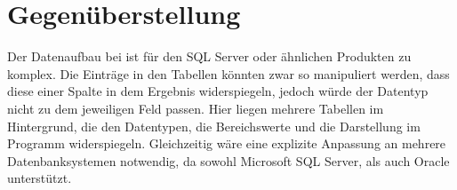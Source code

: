 \section{Gegenüberstellung}
Der Datenaufbau bei \BMD ist für den SQL Server oder ähnlichen Produkten zu komplex.
Die Einträge in den Tabellen könnten zwar so manipuliert werden, dass diese einer Spalte in dem Ergebnis widerspiegeln, jedoch würde der Datentyp nicht zu dem jeweiligen Feld passen. Hier liegen mehrere Tabellen im Hintergrund, die den Datentypen, die Bereichswerte und die Darstellung im Programm widerspiegeln. 
Gleichzeitig wäre eine explizite Anpassung an mehrere Datenbanksystemen notwendig, da \BMD sowohl Microsoft SQL Server, als auch Oracle unterstützt.